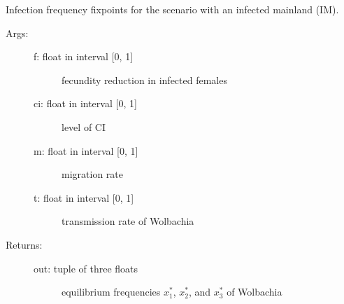 \documentclass[letterpaper,10pt,english]{sphinxmanual}
\begin{document}
\begin{fulllineitems}
\label{index:wspec.analytical.fix_UM}
Infection frequency fixpoints for the scenario with an infected 
mainland (IM).
\begin{description}
\item[{Args:}] \leavevmode\begin{description}
\item[{f: float in interval {[}0, 1{]}}] \leavevmode
fecundity reduction in infected females

\item[{ci: float in interval {[}0, 1{]}}] \leavevmode
level of CI

\item[{m: float in interval {[}0, 1{]}}] \leavevmode
migration rate

\item[{t: float in interval {[}0, 1{]}}] \leavevmode
transmission rate of Wolbachia

\end{description}

\item[{Returns:}] \leavevmode\begin{description}
\item[{out: tuple of three floats}] \leavevmode
equilibrium frequencies $x_1^{\ast}$, $x_2^{\ast}$, and $x_3^{\ast}$ of Wolbachia

\end{description}

\end{description}

\end{fulllineitems}

\end{document}
